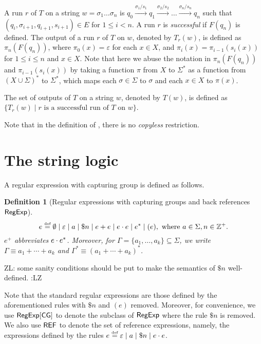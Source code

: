 \documentclass[sigplan,review,anonymous]{acmart}\settopmatter{printfolios=true,printccs=false,printacmref=false}
\newcommand{\zhilin}[1]{\color{brown} {ZL: #1 :LZ} \color{black}}
\newcommand{\zhilin}[1]{}
\newcommand{\tmop}[1]{\ensuremath{\operatorname{#1}}}
\newtheorem{definition}{Definition}
\begin{document}
  A run $r$ of $T$ on a string $w = \sigma_1 \ldots \sigma_n$ is $q_0 \xrightarrow{\sigma_1 / s_1} q_1
  \xrightarrow{\sigma_2 / s_2} \ldots \xrightarrow{\sigma_n / s_n} q_n$ such that
  $(q_i, \sigma_{i + 1}, q_{i + 1}, s_{i + 1}) \in E$ for $1 \le i < n$. A run $r$ is \emph{successful} if $F(q_n)$ is
  defined. 
  The output of a run $r$ of $T$ on $w$, denoted by $T_r(w)$, is defined as $\pi_n(F(q_n))$, where $\pi_0(x) = \varepsilon$ for each $x \in X$, and $\pi_{i}(x) = \pi_{i-1}(s_{i}(x))$ for $1 \le i \le n$ and $x \in X$. Note that here we abuse the notation in $\pi_n(F(q_n))$ and $\pi_{i-1}(s_{i}(x))$ by taking a function $\pi$ from $X$ to $\Sigma^*$ as a function from $(X \cup \Sigma)^*$ to $\Sigma^*$, which maps each $\sigma \in \Sigma$ to $\sigma$ and each $x \in X$ to $\pi(x)$.  
  
  
The set of outputs of $T$ on a string $w$, denoted by $T(w)$, is defined as $\{ T_r(w) \mid  r
\mbox{ is a successful run of } T \mbox{ on } w \}$.

Note that in the definition of \NSST, there is no \emph{copyless} restriction.

\section{The string logic}


A regular expression with capturing group is defined as follows.

\begin{definition}[Regular expressions  with capturing groups and back references ${\sf RegExp}$]
	\[e \eqdef \emptyset \mid \varepsilon \mid a \mid \$n \mid e + e \mid e \concat e \mid e^* \mid (e), \mbox{ where } a \in \Sigma, n \in \Int^+. \]
$e^+$ abbreviates $e \cdot e^*$. Moreover, for $\Gamma = \{a_1, \ldots, a_k\}\subseteq \Sigma$, we write $\Gamma \equiv a_1 + \cdots + a_k$ and $\Gamma^\ast \equiv (a_1 + \cdots + a_k)^\ast$. 
\end{definition}
\zhilin{some sanity conditions should be put to make the semantics of $\$ n$ well-defined.}

Note that the standard regular expressions are those defined by the aforementioned rules with $\$ n$ and $(e)$ removed.
Moreover, for convenience, we use ${\sf RegExp}[\sf CG]$ to denote the subclass of ${\sf RegExp}$ where the rule $\$ n$ is removed. We also use ${\sf REF}$ to denote the set of reference expressions, namely, the expressions defined by the rules $e \eqdef \varepsilon \mid a \mid \$n \mid e \concat e$.
\end{document}
